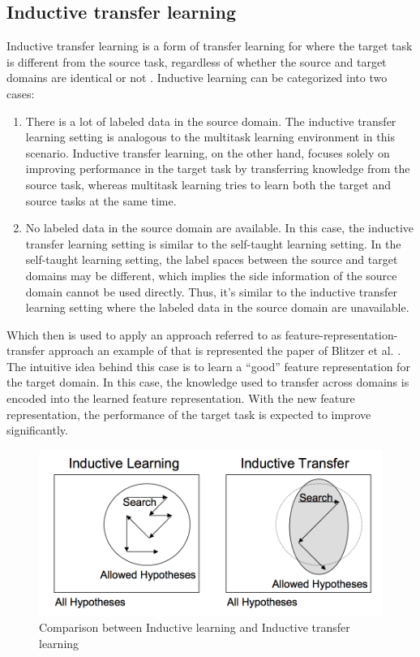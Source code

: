 \documentclass[11pt]{article}
\begin{document}
\subsection{Inductive transfer learning}
 Inductive transfer learning is a form of transfer learning for where the target task is different from the source task, regardless of whether the source and target domains are identical or not \cite{Pan2010ASO}.
 Inductive learning can be categorized into two cases:
 \begin{enumerate}[label=\alph*.]
     \item  There is a lot of labeled data in the source domain. The inductive transfer learning setting is analogous to the multitask learning environment in this scenario. Inductive transfer learning, on the other hand, focuses solely on improving performance in the target task by transferring knowledge from the source task, whereas multitask learning tries to learn both the target and source tasks at the same time.
     \item No labeled data in the source domain are available. In this case, the inductive transfer learning setting is similar to the self-taught learning setting. In the self-taught learning setting, the label spaces between the source and target domains may be different, which implies the side information of the source domain cannot be used directly. Thus, it’s similar to the inductive transfer learning setting where the labeled data in the source domain are unavailable.
 \end{enumerate}
 Which then is used to apply an approach referred to as feature-representation-transfer approach an example of that is represented the paper of Blitzer et al. \cite{blitzer-etal-2007-biographies}. The intuitive idea behind this case is to learn a “good” feature representation for the target domain. In this case, the knowledge used to transfer across domains is encoded into the learned feature representation. With the new feature representation, the performance of the target task is expected to improve significantly.


 \begin{figure}[H]
    \centering
    \includegraphics[width=0.8\linewidth, frame]{inductive transfer.png}
    \caption{\small Comparison between Inductive learning and Inductive transfer learning}
    \label{fig:pre_trained}
\end{figure}
\end{document}
